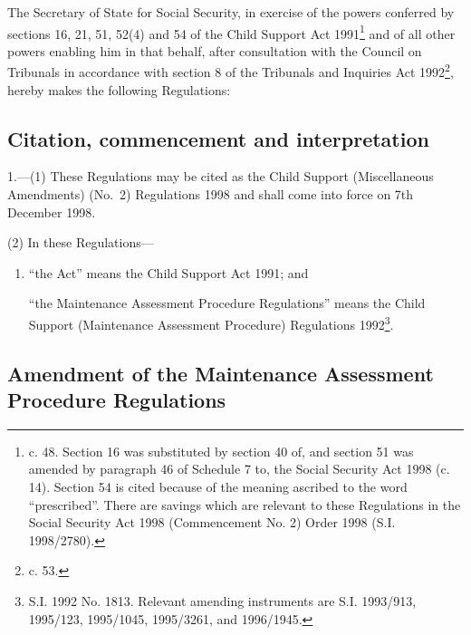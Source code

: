 \documentclass[12pt,a4paper]{article}
\title{\regstitle}
\author{S.I. 1998 No. 2799}
\date{Made 16th November 1998\\Laid beford Parliament 16th November 1998\\Coming into force 7th December 1998}
\begin{document}
\maketitle

\noindent
The Secretary of State for Social Security, in exercise of the powers conferred by sections 16, 21, 51, 52(4) and 54 of the Child Support Act 1991\footnote{ c. 48. Section 16 was substituted by section 40 of, and section 51 was amended by paragraph 46 of Schedule 7 to, the Social Security Act 1998 (c. 14). Section 54 is cited because of the meaning ascribed to the word “prescribed”. There are savings which are relevant to these Regulations in the Social Security Act 1998 (Commencement No. 2) Order 1998 (S.I. 1998/2780).} and of all other powers enabling him in that behalf, after consultation with the Council on Tribunals in accordance with section 8 of the Tribunals and Inquiries Act 1992\footnote{ c. 53.}, hereby makes the following Regulations:

{\sloppy

\tableofcontents

}

\bigskip

\setcounter{secnumdepth}{-2}

\subsection[1. Citation, commencement and interpretation]{Citation, commencement and interpretation}

1.—(1) These Regulations may be cited as the Child Support (Miscellaneous Amendments) (No.\ 2) Regulations 1998 and shall come into force on 7th December 1998.

(2) In these Regulations—
\begin{enumerate}\item[]
“the Act” means the Child Support Act 1991; and

“the Maintenance Assessment Procedure Regulations” means the Child Support (Maintenance Assessment Procedure) Regulations 1992\footnote{\frenchspacing S.I. 1992 No. 1813. Relevant amending instruments are S.I. 1993/913, 1995/123, 1995/1045, 1995/3261, and 1996/1945.}.
\end{enumerate}

\subsection[2. Amendment of the Maintenance Assessment Procedure Regulations]{Amendment of the Maintenance Assessment Procedure Regulations}
\end{document}
